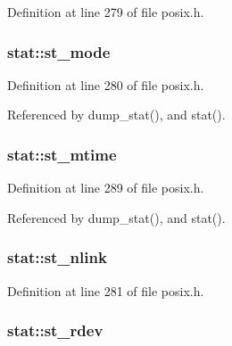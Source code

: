 Definition at line 279 of file posix.\+h.

\subsubsection[{\texorpdfstring{st\+\_\+mode}{st_mode}}]{ stat\+::st\+\_\+mode}\hypertarget{structstat_a5cbdd829011af82ba61e83773bbcbc7d}{}\label{structstat_a5cbdd829011af82ba61e83773bbcbc7d}


Definition at line 280 of file posix.\+h.



Referenced by dump\+\_\+stat(), and stat().

\subsubsection[{\texorpdfstring{st\+\_\+mtime}{st_mtime}}]{ stat\+::st\+\_\+mtime}\hypertarget{structstat_a77e235090f8cb6897f1c0ce65689006b}{}\label{structstat_a77e235090f8cb6897f1c0ce65689006b}


Definition at line 289 of file posix.\+h.



Referenced by dump\+\_\+stat(), and stat().

\subsubsection[{\texorpdfstring{st\+\_\+nlink}{st_nlink}}]{ stat\+::st\+\_\+nlink}\hypertarget{structstat_a0ed9092fa6c77a3251b9b9a4738ef84f}{}\label{structstat_a0ed9092fa6c77a3251b9b9a4738ef84f}


Definition at line 281 of file posix.\+h.

\subsubsection[{\texorpdfstring{st\+\_\+rdev}{st_rdev}}]{ stat\+::st\+\_\+rdev}\hypertarget{structstat_aa61e6c1a8a91c69f1d26f6700a0546cb}{}\label{structstat_aa61e6c1a8a91c69f1d26f6700a0546cb}


